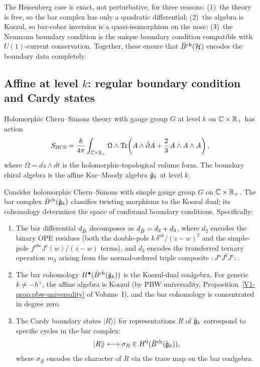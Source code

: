 \begin{remark}
The Heisenberg case is exact, not perturbative, for three
reasons: (1)~the theory is free, so the bar complex has only a
quadratic differential; (2)~the algebra is Koszul, so bar-cobar
inversion is a quasi-isomorphism on the nose; (3)~the Neumann boundary
condition is the unique boundary condition compatible with
$U(1)$-current conservation. Together, these ensure that
$\bar{B}^{\mathrm{ch}}(\mathcal{H})$ encodes the boundary data completely.
\end{remark}

\subsection{Affine at level $k$: regular boundary condition and Cardy states}

\begin{setup}
Holomorphic Chern--Simons theory with gauge group $G$ at level $k$ on
$\mathbb{C} \times \mathbb{R}_+$ has action
\[
S_{\mathrm{HCS}} = \frac{k}{4\pi}
 \int_{\mathbb{C} \times \mathbb{R}_+}
 \Omega \wedge \operatorname{Tr}\!\left(A \wedge \bar{\partial} A
 + \frac{2}{3}\, A \wedge A \wedge A\right),
\]
where $\Omega = dz \wedge dt$ is the holomorphic-topological volume form.
The boundary chiral algebra is the affine Kac--Moody algebra
$\hat{\mathfrak{g}}_k$ at level $k$.
\end{setup}

\begin{theorem}
Consider holomorphic Chern--Simons with simple gauge group $G$ on
$\mathbb{C} \times \mathbb{R}_+$. The bar complex $\bar{B}^{\mathrm{ch}}(\hat{\mathfrak{g}}_k)$ classifies
twisting morphisms to the Koszul dual; its cohomology determines
the space of conformal boundary conditions. Specifically:
\begin{enumerate}
\item The bar differential $d_{\bar{B}}$ decomposes as
 $d_{\bar{B}} = d_2 + d_3$, where $d_2$ encodes the binary OPE
 residues (both the double-pole $k\,\delta^{ab}/(z-w)^2$ and the
 simple-pole $f^{abc}J^c(w)/(z-w)$ terms), and $d_3$ encodes the
 transferred ternary operation $m_3$ arising from the normal-ordered
 triple composite $:J^a J^b J^c:$.
\item The bar cohomology $H^\bullet(\bar{B}^{\mathrm{ch}}(\hat{\mathfrak{g}}_k))$ is the
 Koszul-dual coalgebra. For generic $k \neq -h^\vee$, the affine
 algebra is Koszul (by PBW universality,
 Proposition~\ref*{V1-prop:pbw-universality} of Volume~I), and the bar
 cohomology is concentrated in degree zero.
\item The Cardy boundary states $|R\rangle\!\rangle$ for
 representations $R$ of $\hat{\mathfrak{g}}_k$ correspond to specific cycles
 in the bar complex:
 \[
 |R\rangle\!\rangle
 \longleftrightarrow
 \sigma_R \in H^0(\bar{B}^{\mathrm{ch}}(\hat{\mathfrak{g}}_k)),
 \]
 where $\sigma_R$ encodes the character of $R$ via the trace map
 on the bar coalgebra.
\end{enumerate}
\end{theorem}

